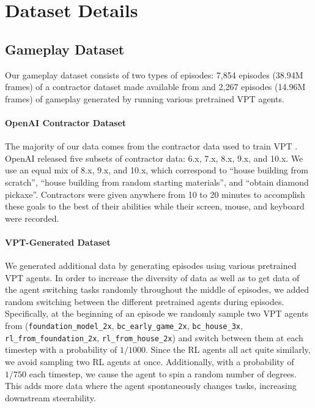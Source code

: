 \section{Dataset Details}
\label{appendix:datasets}

\subsection{Gameplay Dataset}

Our gameplay dataset consists of two types of episodes: 7,854 episodes (38.94M frames) of a contractor dataset made available from \citet{baker2022vpt} and 2,267 episodes (14.96M frames) of gameplay generated by running various pretrained VPT agents. 

\paragraph{OpenAI Contractor Dataset} The majority of our data comes from the contractor data used to train VPT \citep{baker2022vpt}. OpenAI released five subsets of contractor data: 6.x, 7.x, 8.x, 9.x, and 10.x. We use an equal mix of 8.x, 9.x, and 10.x, which correspond to ``house building from scratch'', ``house building from random starting materials'', and ``obtain diamond pickaxe''. Contractors were given anywhere from 10 to 20 minutes to accomplish these goals to the best of their abilities while their screen, mouse, and keyboard were recorded.

\paragraph{VPT-Generated Dataset} We generated additional data by generating episodes using various pretrained VPT agents. In order to increase the diversity of data as well as to get data of the agent switching tasks randomly throughout the middle of episodes, we added random switching between the different pretrained agents during episodes. Specifically, at the beginning of an episode we randomly sample two VPT agents from (\texttt{foundation\_model\_2x}, \texttt{bc\_early\_game\_2x}, \texttt{bc\_house\_3x}, \texttt{rl\_from\_foundation\_2x}, \texttt{rl\_from\_house\_2x}) and switch between them at each timestep with a probability of $1/1000$. Since the RL agents all act quite similarly, we avoid sampling two RL agents at once. Additionally, with a probability of $1/750$ each timestep, we cause the agent to spin a random number of degrees. This adds more data where the agent spontaneously changes tasks, increasing downstream steerability.

